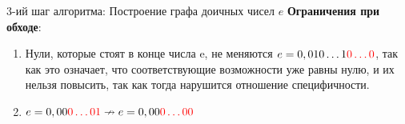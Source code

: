 \documentclass[russian, unicode, mathserif, aspectratio=169]{beamer}
\begin{document}
\begin{frame}{3-ий шаг алгоритма: Построение графа доичных чисел $e$}
    \textbf{Ограничения при обходе}:
    \begin{enumerate} 
    \item Нули, которые стоят в конце числа e, не меняются $e=0,010\ldots1{\color{red}0\ldots0}$, так как это означает, что соответствующие возможности уже равны нулю, и их нельзя повысить, так как тогда нарушится отношение специфичности.
    \begin{figure}[h!]
    \end{figure}
    \item $e=0,00{\color{red}0\ldots01} \nrightarrow e=0,00{\color{red}0\ldots00}$
    \begin{figure}[h!]
    \end{figure}
    \end{enumerate}
\end{frame}
\end{document}
